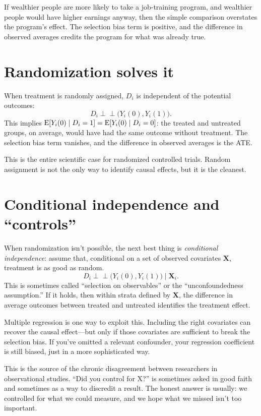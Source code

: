 If wealthier people are more likely to take a job-training program, and wealthier people would have higher earnings anyway, then the simple comparison overstates the program's effect. The selection bias term is positive, and the difference in observed averages credits the program for what was already true.

\section{Randomization solves it}

When treatment is randomly assigned, $D_i$ is independent of the potential outcomes:
\[
  D_i \perp \!\!\! \perp \big(Y_i(0), Y_i(1)\big).
\]
This implies $\operatorname{E}[Y_i(0) \mid D_i = 1] = \operatorname{E}[Y_i(0) \mid D_i = 0]$: the treated and untreated groups, on average, would have had the same outcome without treatment. The selection bias term vanishes, and the difference in observed averages is the ATE.

This is the entire scientific case for randomized controlled trials. Random assignment is not the only way to identify causal effects, but it is the cleanest.

\section{Conditional independence and ``controls''}

When randomization isn't possible, the next best thing is \emph{conditional independence}: assume that, conditional on a set of observed covariates $\bm{X}$, treatment is as good as random.
\[
  D_i \perp \!\!\! \perp \big(Y_i(0), Y_i(1)\big) \mid \bm{X}_i.
\]
This is sometimes called ``selection on observables'' or the ``unconfoundedness assumption.'' If it holds, then within strata defined by $\bm{X}$, the difference in average outcomes between treated and untreated identifies the treatment effect.

Multiple regression is one way to exploit this. Including the right covariates can recover the causal effect---but only if those covariates are sufficient to break the selection bias. If you've omitted a relevant confounder, your regression coefficient is still biased, just in a more sophisticated way.

This is the source of the chronic disagreement between researchers in observational studies. ``Did you control for X?'' is sometimes asked in good faith and sometimes as a way to discredit a result. The honest answer is usually: we controlled for what we could measure, and we hope what we missed isn't too important.

